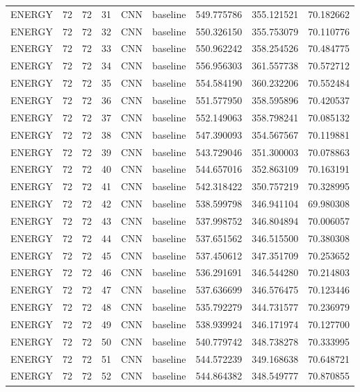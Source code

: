 \begin{table}
\begin{tabular}{lrrrllrrr}
ENERGY & 72 & 72 & 31 & CNN & baseline & 549.775786 & 355.121521 & 70.182662 \\
ENERGY & 72 & 72 & 32 & CNN & baseline & 550.326150 & 355.753079 & 70.110776 \\
ENERGY & 72 & 72 & 33 & CNN & baseline & 550.962242 & 358.254526 & 70.484775 \\
ENERGY & 72 & 72 & 34 & CNN & baseline & 556.956303 & 361.557738 & 70.572712 \\
ENERGY & 72 & 72 & 35 & CNN & baseline & 554.584190 & 360.232206 & 70.552484 \\
ENERGY & 72 & 72 & 36 & CNN & baseline & 551.577950 & 358.595896 & 70.420537 \\
ENERGY & 72 & 72 & 37 & CNN & baseline & 552.149063 & 358.798241 & 70.085132 \\
ENERGY & 72 & 72 & 38 & CNN & baseline & 547.390093 & 354.567567 & 70.119881 \\
ENERGY & 72 & 72 & 39 & CNN & baseline & 543.729046 & 351.300003 & 70.078863 \\
ENERGY & 72 & 72 & 40 & CNN & baseline & 544.657016 & 352.863109 & 70.163191 \\
ENERGY & 72 & 72 & 41 & CNN & baseline & 542.318422 & 350.757219 & 70.328995 \\
ENERGY & 72 & 72 & 42 & CNN & baseline & 538.599798 & 346.941104 & 69.980308 \\
ENERGY & 72 & 72 & 43 & CNN & baseline & 537.998752 & 346.804894 & 70.006057 \\
ENERGY & 72 & 72 & 44 & CNN & baseline & 537.651562 & 346.515500 & 70.380308 \\
ENERGY & 72 & 72 & 45 & CNN & baseline & 537.450612 & 347.351709 & 70.253652 \\
ENERGY & 72 & 72 & 46 & CNN & baseline & 536.291691 & 346.544280 & 70.214803 \\
ENERGY & 72 & 72 & 47 & CNN & baseline & 537.636699 & 346.576475 & 70.123446 \\
ENERGY & 72 & 72 & 48 & CNN & baseline & 535.792279 & 344.731577 & 70.236979 \\
ENERGY & 72 & 72 & 49 & CNN & baseline & 538.939924 & 346.171974 & 70.127700 \\
ENERGY & 72 & 72 & 50 & CNN & baseline & 540.779742 & 348.738278 & 70.333995 \\
ENERGY & 72 & 72 & 51 & CNN & baseline & 544.572239 & 349.168638 & 70.648721 \\
ENERGY & 72 & 72 & 52 & CNN & baseline & 544.864382 & 348.549777 & 70.870855 \\

\end{tabular}
\end{table}
